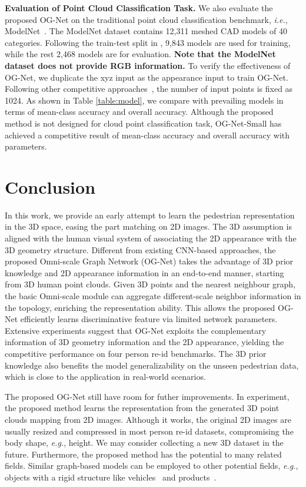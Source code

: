 \documentclass[journal]{IEEEtran}
\def\eg{\emph{e.g.}}
\def\ie{\emph{i.e.}}
\begin{document}
\noindent\textbf{Evaluation of Point Cloud Classification Task.} We also evaluate the proposed OG-Net on the traditional point cloud classification benchmark, \ie, ModelNet~\cite{wu20153d}. The ModelNet dataset contains 12,311 meshed CAD models of 40 categories. Following the train-test split in \cite{wang2019dynamic}, 9,843 models are used for training, while the rest 2,468 models are for evaluation. \textbf{Note that the ModelNet dataset does not provide RGB information.} To verify the effectiveness of OG-Net, we duplicate the xyz input as the appearance input to train OG-Net. Following other competitive approaches~\cite{wang2019dynamic,qi2017pointnet,qi2017pointnet++}, the number of input points is fixed as 1024. As shown in Table \ref{table:model}, we compare with prevailing models in terms of mean-class accuracy and overall accuracy. Although the proposed method is not designed for cloud point classification task, OG-Net-Small has achieved a competitive result of  mean-class accuracy and  overall accuracy with  parameters. 

\section{Conclusion}
In this work, we provide an early attempt to learn the pedestrian representation in the 3D space, easing the part matching on 2D images. The 3D assumption is aligned with the human visual system of associating the 2D appearance with the 3D geometry structure. 
Different from existing CNN-based approaches, the proposed Omni-scale Graph Network (OG-Net) takes the advantage of  3D prior knowledge and 2D appearance information in an end-to-end manner, starting from 3D human point clouds. Given 3D points and the nearest neighbour graph, the basic Omni-scale module can aggregate different-scale neighbor information in the topology, enriching the representation ability. This allows the proposed OG-Net efficiently learns discriminative feature via limited network parameters. Extensive experiments suggest that OG-Net exploits the complementary information of 3D geometry information and the 2D appearance, yielding the competitive performance on four person re-id benchmarks. The 3D prior knowledge also benefits the model generalizability on the unseen pedestrian data, which is close to the application in real-world scenarios. 

The proposed OG-Net still have room for futher improvements. In experiment, the proposed method learns the representation from the generated 3D point clouds mapping from 2D images. Although it works, the original 2D images are usually resized and compressed in most person re-id datasets, compromising the body shape, \eg, height. We may consider collecting a new 3D dataset in the future. Furthermore, the proposed method has the potential to many related fields. Similar graph-based models can be employed to other potential fields, \eg, objects with a rigid structure like vehicles~\cite{tang2019cityflow,zhang2019part} and products~\cite{wei2019rpc,liu2012hi}.  
\end{document}
